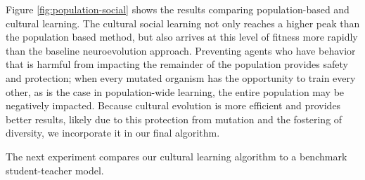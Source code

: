 \documentclass{acm_proc_article-sp}
\begin{document}
Figure \ref{fig:population-social} shows the results comparing population-based and cultural learning. The cultural social learning not only reaches a higher peak than the population based method, but also arrives at this level of fitness more rapidly than the baseline neuroevolution approach. Preventing agents who have behavior that is harmful from impacting the remainder of the population provides safety and protection; when every mutated organism has the opportunity to train every other, as is the case in population-wide learning, the entire population may be negatively impacted. Because cultural evolution is more efficient and provides better results, likely due to this protection from mutation and the fostering of diversity, we incorporate it in our final algorithm.

The next experiment compares our cultural learning algorithm to a benchmark student-teacher model.
\end{document}
